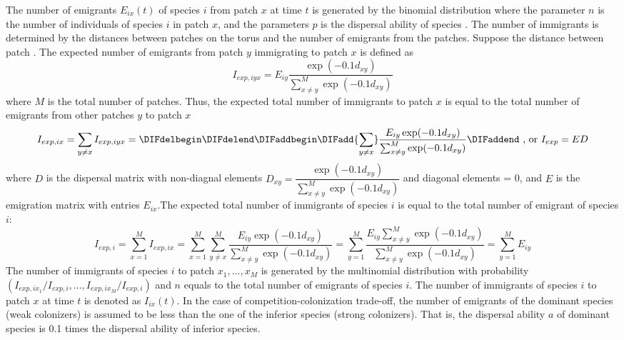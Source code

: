 The number of emigrants $E_{ix}(t)$ of species $i$ from patch $x$ at time $t$ is generated by the binomial distribution where the parameter $n$ is the number of individuals of species $i$ in patch $x$, and the parameters $p$ is the dispersal ability of species \DIFdelbegin {}\DIFdelend \DIFaddbegin {}\DIFaddend . The number of immigrants is determined by the distances between patches on the torus and the number of emigrants from the patches. Suppose the distance between patch \DIFdelbegin {}\DIFdelend \DIFaddbegin {}\DIFaddend . The expected number of emigrants from patch $y$ immigrating to patch $x$ is defined as 
\[
I_{exp,iyx} = E_{iy}\dfrac{\exp(-0.1d_{xy})}{\sum_{x \neq y}^M \exp(-0.1d_{xy})}
\]
where $M$ is the total number of patches. Thus, the expected total number of immigrants to patch $x$ is equal to the total number of emigrants from other patches $y$ to patch $x$ 
\[
I_{exp,ix} = \sum_{y \neq x} I_{exp,iyx} =  \DIFdelbegin %
\DIFdelend \DIFaddbegin \DIFadd{\sum_{y \neq x}}\dfrac{E_{iy}\exp(-0.1d_{xy})}{\sum_{x \neq y}^M \exp(-0.1d_{xy})}
\DIFaddend \text{ , or }
I_{exp} = ED
\]
where $D$ is the dispersal matrix with non-diagnal elements $D_{xy} = \dfrac{\exp(-0.1d_{xy})}{\sum_{x \neq y}^{M} \exp(-0.1d_{xy})}$ and diagonal elements = 0, and $E$ is the emigration matrix with entries $E_{ix}$.The expected total number of immigrants of species $i$ is equal to the total number of emigrant of species $i$: 
\[
I_{exp,i} = 
\sum_{x = 1}^M I_{exp,ix} = 
\sum_{x = 1}^M \sum_{y \neq x}^M \frac{E_{iy}\exp(-0.1d_{xy})}{\sum_{x \neq y}^{M} \exp(-0.1d_{xy})} = 
\sum_{y = 1}^M \frac{E_{iy} \sum_{x \neq y}^M \exp(-0.1d_{xy})}{\sum_{x \neq y}^{M} \exp(-0.1d_{xy})} =
\sum_{y = 1}^M E_{iy}
\]
The number of immigrants of species $i$ to patch $x_1,\dots,x_M$ is generated by the multinomial distribution with probability $(I_{exp,ix_1}/I_{exp,i},\dots,I_{exp,ix_M}/I_{exp,i})$ and $n$ equals to the total number of emigrants of species $i$. The number of immigrants of species $i$ to patch $x$ at time $t$ is denoted as $I_{ix}(t)$. In the case of competition-colonization trade-off, the number of emigrants of the dominant species (weak colonizers) is assumed to be less than the one of the inferior species (strong colonizers). That is, the dispersal ability $a$ of dominant species is 0.1 times the dispersal ability of inferior species.

